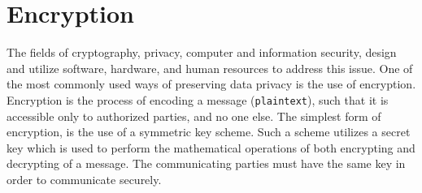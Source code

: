 \section{Encryption}\label{s:encryption}
The fields of cryptography, privacy, computer and information security, design and utilize software, hardware, and human resources to address this issue.
One of the most commonly used ways of preserving data privacy is the use of encryption. Encryption is the process of encoding a message (\texttt{plaintext}), such that it is accessible only to authorized parties, and no one else.
The simplest form of encryption, is the use of a symmetric key scheme. Such a scheme utilizes a secret key which is used to perform the mathematical operations of both encrypting and decrypting of a message.
The communicating parties must have the same key in order to communicate securely.
